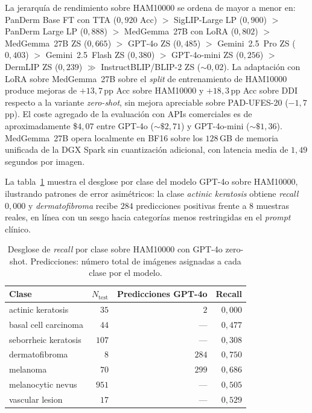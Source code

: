 La jerarquía de rendimiento sobre HAM10000 se ordena de mayor a
menor en: PanDerm Base FT con TTA ($0{,}920$ Acc) $>$
SigLIP-Large LP ($0{,}900$) $>$ PanDerm Large LP ($0{,}888$) $>$
MedGemma~27B con LoRA ($0{,}802$) $>$ MedGemma~27B ZS
($0{,}665$) $>$
GPT-4o ZS ($0{,}485$) $>$ Gemini~2.5~Pro ZS ($0{,}403$) $>$
Gemini~2.5~Flash ZS ($0{,}380$) $>$ GPT-4o-mini ZS ($0{,}256$)
$>$ DermLIP ZS ($0{,}239$) $\gg$ InstructBLIP/BLIP-2 ZS
($\sim 0{,}02$). La adaptación con LoRA sobre MedGemma~27B sobre
el \emph{split} de entrenamiento de HAM10000 produce mejoras de
$+13{,}7$\,pp Acc sobre HAM10000 y $+18{,}3$\,pp Acc sobre
DDI respecto a la variante \emph{zero-shot}, sin mejora apreciable
sobre PAD-UFES-20 ($-1{,}7$\,pp). El coste agregado de la
evaluación con APIs comerciales es de aproximadamente
\$$4{,}07$ entre GPT-4o ($\sim\$2{,}71$) y
GPT-4o-mini ($\sim\$1{,}36$). MedGemma~27B opera localmente en
BF16 sobre los $128$\,GB de memoria unificada de la DGX Spark
sin cuantización adicional, con latencia media de $1{,}49$
segundos por imagen.

La tabla~\ref{tab:gpt4o-perclass} muestra el desglose por clase del
modelo GPT-4o sobre HAM10000, ilustrando patrones de error
asimétricos: la clase \emph{actinic keratosis} obtiene
\emph{recall} $0{,}000$ y \emph{dermatofibroma} recibe
$284$ predicciones positivas frente a $8$ muestras reales,
en línea con un sesgo hacia categorías menos restringidas en el
\emph{prompt} clínico.

\begin{table}[H]
\centering
\footnotesize
\setlength{\tabcolsep}{4pt}
\caption{Desglose de \emph{recall} por clase sobre HAM10000 con
GPT-4o zero-shot. Predicciones: número total de imágenes asignadas a
cada clase por el modelo.}
\label{tab:gpt4o-perclass}
\begin{tabular}{lrrr}
\hline
Clase                       & $N_{\mathrm{test}}$ & Predicciones GPT-4o & Recall \\
\hline
actinic keratosis           & $35$    & $2$     & $0{,}000$ \\
basal cell carcinoma        & $44$    & ---     & $0{,}477$ \\
seborrheic keratosis        & $107$   & ---     & $0{,}308$ \\
dermatofibroma              & $8$     & $284$   & $0{,}750$ \\
melanoma                    & $70$    & $299$   & $0{,}686$ \\
melanocytic nevus           & $951$   & ---     & $0{,}505$ \\
vascular lesion             & $17$    & ---     & $0{,}529$ \\
\hline
\end{tabular}
\end{table}

